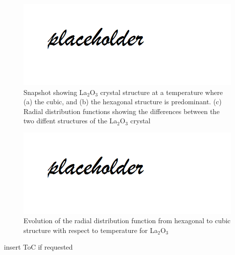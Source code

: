 \documentclass[journal=jpcafh,manuscript=article]{achemso}
\begin{document}
\pagebreak

\begin{figure}[hbtp]
\centering
\includegraphics[scale=0.75]{Paper/images/placeholder.png}
\caption{Snapshot showing La$_2$O$_3$ crystal structure at a temperature where (a) the cubic, and (b) the hexagonal structure is predominant. (c) Radial distribution functions showing the differences between the two diffent structures of the La$_2$O$_3$ crystal}
\label{fig:La2O3-A-C-RDF}
\end{figure}


\pagebreak

\begin{figure}[hbtp]
\centering
\includegraphics[scale=0.75]{Paper/images/placeholder.png}
\caption{Evolution of the radial distribution function from hexagonal to cubic structure with respect to temperature for La$_2$O$_3$}
\label{fig:La2O3RDFevolution}
\end{figure}

\pagebreak


\pagebreak
\begin{tocentry}
\begin{center}
insert ToC if requested
\end{center}
\end{tocentry}
\end{document}
